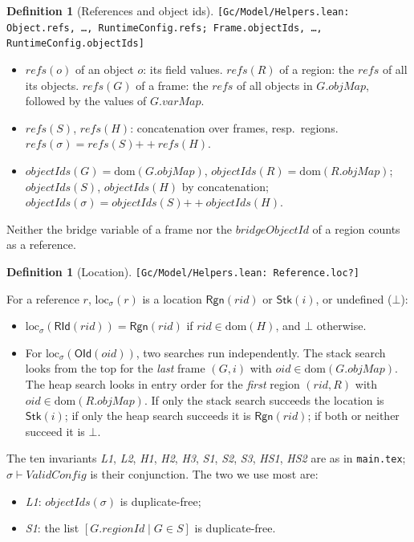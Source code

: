 \documentclass[11pt]{article}
\theoremstyle{definition}
\newtheorem{definition}[theorem]{Definition}
\theoremstyle{remark}
\newcommand{\lean}[1]{\hfill{\footnotesize\upshape\texttt{[#1]}}\par\noindent\ignorespaces}
\newcommand{\RId}{\mathsf{RId}}
\newcommand{\OId}{\mathsf{OId}}
\newcommand{\Rgn}{\mathsf{Rgn}}
\newcommand{\Stk}{\mathsf{Stk}}
\newcommand{\loc}[2]{\mathrm{loc}_{#1}(#2)}
\newcommand{\refs}{\mathit{refs}}
\newcommand{\oids}{\mathit{objectIds}}
\newcommand{\rid}{\mathit{regionId}}
\newcommand{\omap}{\mathit{objMap}}
\newcommand{\vmap}{\mathit{varMap}}
\newcommand{\bridge}{\mathit{bridgeObjectId}}
\newcommand{\dom}{\mathrm{dom}}
\newcommand{\cat}{\mathbin{+\!\!+}}
\newcommand{\noloc}{\bot}
\newcommand{\inv}[1]{\textit{#1}}
\begin{document}
\begin{definition}[References and object ids]
\lean{Gc/Model/Helpers.lean: Object.refs, \dots, RuntimeConfig.refs; Frame.objectIds, \dots,
RuntimeConfig.objectIds}
\begin{itemize}[nosep]
  \item $\refs(o)$ of an object $o$: its field values. $\refs(R)$ of a region: the $\refs$ of all its
    objects. $\refs(G)$ of a frame: the $\refs$ of all objects in $G.\omap$, followed by the values
    of $G.\vmap$.
  \item $\refs(S)$, $\refs(H)$: concatenation over frames, resp.\ regions.
    $\refs(\sigma) = \refs(S) \cat \refs(H)$.
  \item $\oids(G) = \dom(G.\omap)$, $\oids(R) = \dom(R.\omap)$; $\oids(S)$, $\oids(H)$ by
    concatenation; $\oids(\sigma) = \oids(S) \cat \oids(H)$.
\end{itemize}
Neither the bridge variable of a frame nor the $\bridge$ of a region counts as a reference.
\end{definition}

\begin{definition}[Location]
\label{def:loc}
\lean{Gc/Model/Helpers.lean: Reference.loc?}
For a reference $r$, $\loc{\sigma}{r}$ is a location $\Rgn(rid)$ or $\Stk(i)$, or undefined
($\noloc$):
\begin{itemize}[nosep]
  \item $\loc{\sigma}{\RId(rid)} = \Rgn(rid)$ if $rid \in \dom(H)$, and $\noloc$ otherwise.
  \item For $\loc{\sigma}{\OId(oid)}$, two searches run independently. The stack search looks from
    the top for the \emph{last} frame $(G,i)$ with $oid \in \dom(G.\omap)$. The heap search looks in
    entry order for the \emph{first} region $(rid, R)$ with $oid \in \dom(R.\omap)$. If only the stack search succeeds the location is
    $\Stk(i)$; if only the heap search succeeds it is $\Rgn(rid)$; if both or neither succeed it is
    $\noloc$.
\end{itemize}
\end{definition}

The ten invariants \inv{L1}, \inv{L2}, \inv{H1}, \inv{H2}, \inv{H3}, \inv{S1}, \inv{S2},
\inv{S3}, \inv{HS1}, \inv{HS2} are as in \texttt{main.tex}; $\sigma \vdash \inv{ValidConfig}$ is
their conjunction. The two we use most are:
\begin{itemize}[nosep]
  \item \inv{L1}: $\oids(\sigma)$ is duplicate-free;
  \item \inv{S1}: the list $[G.\rid \mid G \in S]$ is duplicate-free.
\end{itemize}
\end{document}

